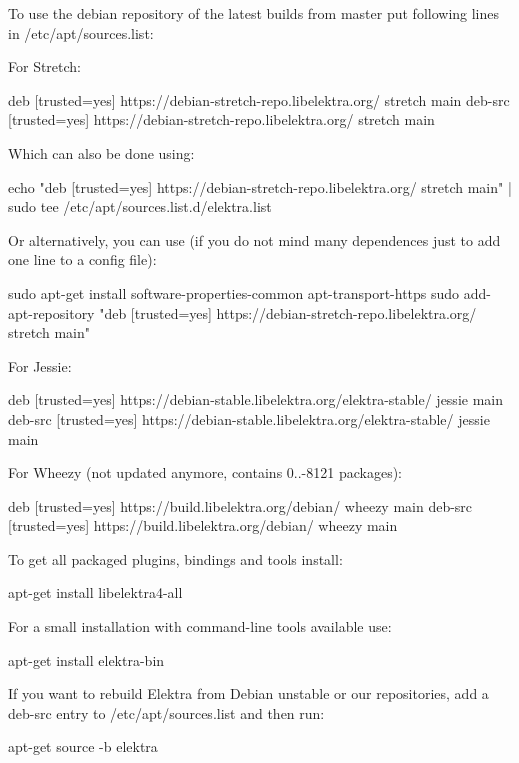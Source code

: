 To use the debian repository of the latest builds from master put following lines in {\ttfamily /etc/apt/sources.list}\+:

For Stretch\+: \begin{DoxyVerb}    deb     [trusted=yes] https://debian-stretch-repo.libelektra.org/ stretch main
    deb-src [trusted=yes] https://debian-stretch-repo.libelektra.org/ stretch main
\end{DoxyVerb}


Which can also be done using\+: \begin{DoxyVerb}    echo "deb     [trusted=yes] https://debian-stretch-repo.libelektra.org/ stretch main" | sudo tee /etc/apt/sources.list.d/elektra.list
\end{DoxyVerb}


Or alternatively, you can use (if you do not mind many dependences just to add one line to a config file)\+: \begin{DoxyVerb}    sudo apt-get install software-properties-common apt-transport-https
    sudo add-apt-repository "deb     [trusted=yes] https://debian-stretch-repo.libelektra.org/ stretch main"
\end{DoxyVerb}


For Jessie\+: \begin{DoxyVerb}    deb     [trusted=yes] https://debian-stable.libelektra.org/elektra-stable/ jessie main
    deb-src [trusted=yes] https://debian-stable.libelektra.org/elektra-stable/ jessie main
\end{DoxyVerb}


For Wheezy (not updated anymore, contains 0..-\/8121 packages)\+: \begin{DoxyVerb}    deb     [trusted=yes] https://build.libelektra.org/debian/ wheezy main
    deb-src [trusted=yes] https://build.libelektra.org/debian/ wheezy main
\end{DoxyVerb}


To get all packaged plugins, bindings and tools install\+: \begin{DoxyVerb}    apt-get install libelektra4-all
\end{DoxyVerb}


For a small installation with command-\/line tools available use\+: \begin{DoxyVerb}    apt-get install elektra-bin
\end{DoxyVerb}


If you want to rebuild Elektra from Debian unstable or our repositories, add a {\ttfamily deb-\/src} entry to {\ttfamily /etc/apt/sources.list} and then run\+: \begin{DoxyVerb}    apt-get source -b elektra
\end{DoxyVerb}


